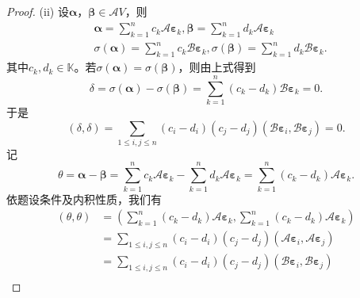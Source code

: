 \begin{enumerate}[1~]
\begin{proof}
(ii) 设$\boldsymbol{\alpha}$，$\boldsymbol{\beta} \in \mathscr{A}V$，则
\begin{align*}
&{ \boldsymbol{\alpha} } = \sum _ { k = 1 } ^ { n } c _ { k }  {\mathscr{A}\boldsymbol{\varepsilon} } _ { k } , { \boldsymbol{\beta} } = \sum _ { k = 1 } ^ { n } d _ { k }  { \mathscr{A}\boldsymbol{\varepsilon} } _ { k } \\ 
&{ \sigma ( { \boldsymbol{\alpha} } ) = \sum _ { k = 1 } ^ {n } c _ { 
k }  { \mathscr{B}\boldsymbol{\varepsilon} } _ { k } , \sigma (  
{ \boldsymbol{\beta} } ) = \sum _ { k = 1 } ^ { n } d _ { k }  { 
\mathscr{B}\boldsymbol{\varepsilon} } _ { k } }. 
\end{align*}
其中$c _ { k } , d _ { k } \in \mathbb{K}$。若$\sigma (  { \boldsymbol{\alpha} } ) = \sigma (  { \boldsymbol{\beta} } )$，则由上式得到
\[
 { \delta } = \sigma (  { \boldsymbol{\alpha} } ) - \sigma (  { \boldsymbol{\beta} } ) = \sum _ { k = 1 } ^ { n } \left( c _ { k } - d _ { k } \right)  { \mathscr{B}\boldsymbol{\varepsilon} } _ { k } =  { 0 }.
 \]
于是\[
( \delta , \delta ) = \sum _ { 1 \leq i , j \leqslant n } \left( c _ { i } - d _ { i } \right) \left( c _ { j } - d _ { j } \right) \left(  { \mathscr{B}\boldsymbol{\varepsilon} } _ { i } ,  { \mathscr{B}\boldsymbol{\varepsilon} } _ { j } \right) = 0.
\]
记
\[
 { \theta } =  { \boldsymbol{\alpha} } -  { \boldsymbol{\beta} } = \sum _ { k = 1 } ^ { n } c _ { k }  { \mathscr{A}\boldsymbol{\varepsilon} } _ { k } - \sum _ { k = 1 } ^ { n } d _ { k }  { \mathscr{A}\boldsymbol{\varepsilon} } _ { k } = \sum _ { k = 1 } ^ { n } \left( c _ { k } - d _ { k } \right)  { \mathscr{A}\boldsymbol{\varepsilon} } _ { k }.
\]
依题设条件及内积性质，我们有
\begin{align*}
 (  { \theta } ,  { \theta } ) 
& = \left( \sum _ { k = 1 } ^ { n } \left( c _ { k } - d _ { k } \right)  { \mathscr{A}\boldsymbol{\varepsilon} } _ { k } , \sum _ { k 
= 1 } ^ { n } \left( c _ { k } - d _ { k } \right)  
{\mathscr{A}\boldsymbol{\varepsilon} } _ { k } \right) \\ 
& = \sum _ { 1 \leq i , j \leqslant n } \left( c _ { i } - d _ { i } \right) \left( c _ { j } - d _ { j } \right) \left(  { 
\mathscr{A}\boldsymbol{\varepsilon} } _ { i } ,  { \mathscr{A}\boldsymbol{\varepsilon} } _ { j } \right) \\ 
& = \sum _ { 1 \leq i , j \leqslant n } \left( c _ { i } - d _ { i } \right) \left( c _ { j } - d _ { j } \right) \left(  { 
\mathscr{B}\boldsymbol{\varepsilon} } _ { i } ,  { \mathscr{B}
\boldsymbol{\varepsilon} } _ { j } \right) \\ 

\end{align*}
\end{proof}
\end{enumerate}
